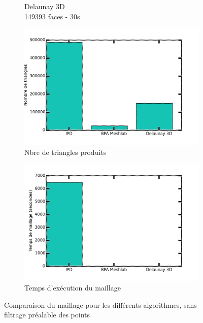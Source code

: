 \documentclass[a4paper,10pt]{report}
\begin{document}
\begin{figure}[h!]
\begin{subfigure}[b]{0.3\textwidth}
        \caption{Delaunay 3D\\149393 faces - 30s}
    \end{subfigure}
    \begin{subfigure}[b]{0.3\textwidth}
	    \includegraphics[width=\textwidth]{results/algos-nodp-triangles-cmp.png}
        \caption{Nbre de triangles produits}
    \end{subfigure}
    \begin{subfigure}[b]{0.3\textwidth}
	    \includegraphics[width=\textwidth]{results/algos-nodp-time-cmp.png}
        \caption{Temps d'exécution du maillage}
    \end{subfigure}
    \caption{Comparaison du maillage pour les différents algorithmes, sans filtrage préalable des points}
\end{figure}
\end{document}
